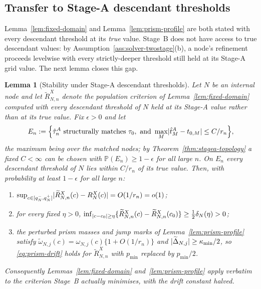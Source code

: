 \documentclass[11pt]{article}
\theoremstyle{plain}
\newtheorem{lemma}[theorem]{Lemma}
\theoremstyle{definition}
\theoremstyle{remark}
\newcommand{\PP}{\mathbb{P}}
\DeclarePairedDelimiter{\abs}{\lvert}{\rvert}
\begin{document}
\subsection{Transfer to Stage-A descendant thresholds}
\label{sec:stageb-descendant}

Lemma~\ref{lem:fixed-domain} and Lemma~\ref{lem:prism-profile} are
both stated with every descendant threshold at its \emph{true} value.
Stage~B does not have access to true descendant values: by
Assumption~\ref{ass:solver-twostage}(b), a node's refinement proceeds
levelwise with every strictly-deeper threshold still held at its
Stage-A grid value. The next lemma closes this gap.

\begin{lemma}[Stability under Stage-A descendant thresholds]
\label{lem:descendant-stability}
Let \(N\) be an internal node and let \(\widetilde R^X_{N,n}\) denote the
population criterion of Lemma~\ref{lem:fixed-domain} computed with
every descendant threshold of \(N\) held at its Stage-A value rather than at
its true value. Fix \(\epsilon>0\) and let
\[
  E_n:=
  \Bigl\{
    \hat\tau^A_n\text{ structurally matches }\tau_0,\text{ and }
    \max_M\abs{\hat t^A_M-t_{0,M}}\le C/r_n
  \Bigr\},
\]
the maximum being over the matched nodes; by
Theorem~\ref{thm:stagea-topology} a fixed \(C<\infty\) can be chosen with
\(\PP(E_n)\ge1-\epsilon\) for all large \(n\). On \(E_n\) every descendant
threshold of \(N\) lies within \(C/r_n\) of its true value. Then, with
probability at least \(1-\epsilon\) for all large \(n\):
\begin{enumerate}[label=(\alph*),nosep]
  \item \(\sup_{c\in[q_N^-,q_N^+]}
    \abs{\widetilde R^X_{N,n}(c)-R_N^X(c)}=O(1/r_n)=o(1)\);
  \item for every fixed \(\eta>0\),
    \(\inf_{\abs{c-c_0}\ge\eta}
      \{\widetilde R^X_{N,n}(c)-\widetilde R^X_{N,n}(c_0)\}
      \ge\tfrac12\delta_N(\eta)>0\);
  \item the perturbed prism masses and jump marks of
    Lemma~\ref{lem:prism-profile} satisfy
    \(\widetilde\omega_{N,j}(c)=\omega_{N,j}(c)\{1+O(1/r_n)\}\) and
    \(\abs{\widetilde\Delta_{N,j}}\ge\kappa_{\min}/2\), so
    \eqref{eq:prism-drift} holds for \(\widetilde R^X_{N,n}\) with
    \(p_{\min}\) replaced by \(p_{\min}/2\).
\end{enumerate}
Consequently Lemmas~\ref{lem:fixed-domain} and~\ref{lem:prism-profile}
apply verbatim to the criterion Stage~B actually minimises, with the drift
constant halved.
\end{lemma}
\end{document}
